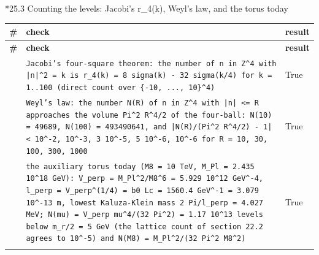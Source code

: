 \documentclass[10pt,a4paper]{article}
\makeatletter
\renewcommand\subsubsection{\@startsection{subsubsection}{3}{\z@}{-3.25ex\@plus -1ex \@minus -.2ex}{1.5ex \@plus .2ex}{\normalfont\normalsize\bfseries\raggedright}}
\makeatother
\begin{document}
\subsubsection*{25.3 Counting the levels: Jacobi’s r\_4(k), Weyl’s law, and the torus today}
{\footnotesize
\begin{longtable}{>{\raggedright\arraybackslash}p{}>{\raggedright\arraybackslash}p{}>{\raggedright\arraybackslash}p{}}
\toprule
\textbf{\#} & \textbf{check} & \textbf{result} \\
\midrule\endfirsthead
\toprule
\textbf{\#} & \textbf{check} & \textbf{result} \\
\midrule\endhead
\endfoot
\bottomrule\endlastfoot
427 & \texttt{Jacobi's four-square theorem: the number of n in Z\textasciicircum{}4 with |n|\textasciicircum{}2 = k is r\_\allowbreak{}4(k) = 8 sigma(k) - 32 sigma(k/\allowbreak{}4) for k = 1..100 (direct count over \{-10, ..., 10\}\textasciicircum{}4)} & True \\
428 & \texttt{Weyl's law: the number N(R) of n in Z\textasciicircum{}4 with |n| <= R approaches the volume Pi\textasciicircum{}2 R\textasciicircum{}4/\allowbreak{}2 of the four-ball: N(10) = 49689, N(100) = 493490641, and |N(R)/\allowbreak{}(Pi\textasciicircum{}2 R\textasciicircum{}4/\allowbreak{}2) - 1| < 10\textasciicircum{}-2, 10\textasciicircum{}-3, 3 10\textasciicircum{}-5, 5 10\textasciicircum{}-6, 10\textasciicircum{}-6 for R = 10, 30, 100, 300, 1000} & True \\
429 & \texttt{the auxiliary torus today (M8 = 10 TeV, M\_\allowbreak{}Pl = 2.435 10\textasciicircum{}18 GeV): V\_\allowbreak{}perp = M\_\allowbreak{}Pl\textasciicircum{}2/\allowbreak{}M8\textasciicircum{}6 = 5.929 10\textasciicircum{}12 GeV\textasciicircum{}-4, l\_\allowbreak{}perp = V\_\allowbreak{}perp\textasciicircum{}(1/\allowbreak{}4) = b0 Lc = 1560.4 GeV\textasciicircum{}-1 = 3.079 10\textasciicircum{}-13 m, lowest Kaluza-Klein mass 2 Pi/\allowbreak{}l\_\allowbreak{}perp = 4.027 MeV; N(mu) = V\_\allowbreak{}perp mu\textasciicircum{}4/\allowbreak{}(32 Pi\textasciicircum{}2) = 1.17 10\textasciicircum{}13 levels below m\_\allowbreak{}r/\allowbreak{}2 = 5 GeV (the lattice count of section 22.2 agrees to 10\textasciicircum{}-5) and N(M8) = M\_\allowbreak{}Pl\textasciicircum{}2/\allowbreak{}(32 Pi\textasciicircum{}2 M8\textasciicircum{}2)} & True \\*
\end{longtable}}
\end{document}
